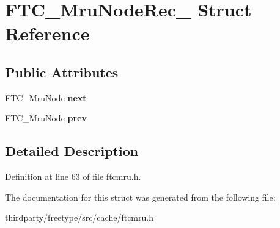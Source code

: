 \hypertarget{struct_f_t_c___mru_node_rec__}{}\section{F\+T\+C\+\_\+\+Mru\+Node\+Rec\+\_\+ Struct Reference}
\label{struct_f_t_c___mru_node_rec__}
\subsection*{Public Attributes}
\begin{DoxyCompactItemize}
\item 
\mbox{\label{struct_f_t_c___mru_node_rec___a49f8fd3f2aa98a0e33d65314b69bea4c}} 
F\+T\+C\+\_\+\+Mru\+Node {\bfseries next}
\item 
\mbox{\label{struct_f_t_c___mru_node_rec___a3fa5127bff373596d2374c0524e7f0ed}} 
F\+T\+C\+\_\+\+Mru\+Node {\bfseries prev}
\end{DoxyCompactItemize}


\subsection{Detailed Description}


Definition at line 63 of file ftcmru.\+h.



The documentation for this struct was generated from the following file\+:\begin{DoxyCompactItemize}
\item 
thirdparty/freetype/src/cache/ftcmru.\+h\end{DoxyCompactItemize}
